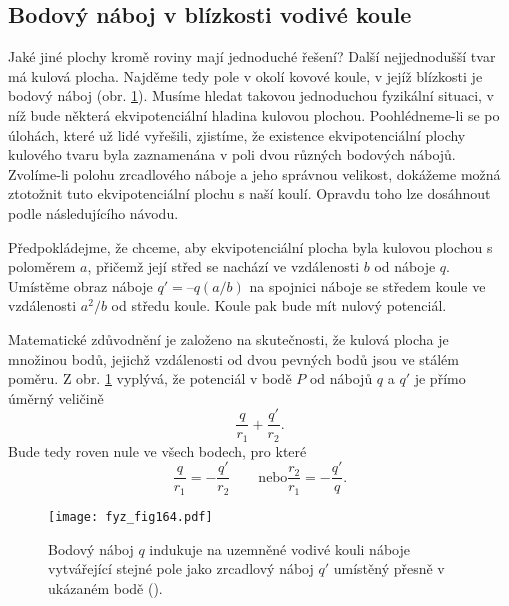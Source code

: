 {  \subsection{Bodový náboj v blízkosti vodivé koule}  %
    Jaké jiné plochy kromě roviny mají jednoduché řešení? Další nejjednodušší tvar má kulová 
    plocha. Najděme tedy pole v okolí kovové koule, v jejíž blízkosti je bodový náboj (obr. 
    \ref{fyz:fig164}). Musíme hledat takovou jednoduchou fyzikální situaci, v níž bude některá 
    ekvipotenciální hladina kulovou plochou. Poohlédneme-li se po úlohách, které už lidé vyřešili, 
    zjistíme, že existence ekvipotenciální plochy kulového tvaru byla zaznamenána v poli dvou 
    různých bodových nábojů. Zvolíme-li polohu zrcadlového náboje a jeho správnou velikost, 
    dokážeme možná ztotožnit tuto ekvipotenciální plochu s naší koulí. Opravdu toho lze dosáhnout 
    podle následujícího návodu.
    
    Předpokládejme, že chceme, aby ekvipotenciální plocha byla kulovou plochou s poloměrem \(a\), 
    přičemž její střed se nachází ve vzdálenosti \(b\) od náboje \(q\). Umístěme obraz náboje \(q' 
    = –q(a/b)\) na spojnici náboje se středem koule ve vzdálenosti \(a^2/b\) od středu koule. Koule 
    pak bude mít nulový potenciál.
    
    Matematické zdůvodnění je založeno na skutečnosti, že kulová plocha je množinou bodů, jejichž 
    vzdálenosti od dvou pevných bodů jsou ve stálém poměru. Z obr. \ref{fyz:fig164} vyplývá, že 
    potenciál v bodě \(P\) od nábojů \(q\) a \(q'\) je přímo úměrný veličině
    \begin{equation*}
      \dfrac{q}{r_1} + \dfrac{q'}{r_2}.
    \end{equation*}
    Bude tedy roven nule ve všech bodech, pro které
    \begin{equation*}
      \dfrac{q}{r_1} = -\dfrac{q'}{r_2} \qquad\text{nebo} \dfrac{r_2}{r_1} = -\dfrac{q'}{q}.
    \end{equation*}
    
    \begin{figure}[ht!]  %
      \centering
      \texttt{[image: fyz\_fig164.pdf]}
      \caption{Bodový náboj \(q\) indukuje na uzemněné vodivé kouli náboje vytvářející stejné pole 
               jako zrcadlový náboj \(q'\) umístěný přesně v ukázaném bodě 
               (\cite[s.~113]{Feynman02}).}
      \label{fyz:fig164}
    \end{figure}
    
}
